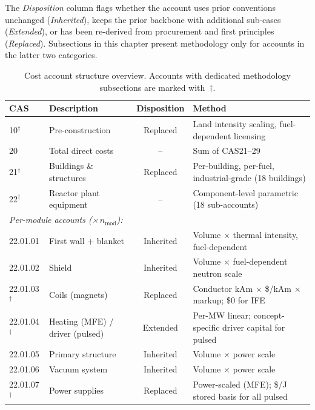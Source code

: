\documentclass{article}
\begin{document}
The \emph{Disposition} column flags whether the account uses prior
conventions unchanged (\emph{Inherited}), keeps the prior backbone
with additional sub-cases (\emph{Extended}), or has been re-derived
from procurement and first principles (\emph{Replaced}). Subsections
in this chapter present methodology only for accounts in the latter
two categories.

\begin{table}[htbp]
\caption{Cost account structure overview. Accounts with dedicated
methodology subsections are marked with~$\dagger$.}
\label{tab:cas-overview}
\centering
\begin{tabular}{llcp{6.0cm}}
\toprule
CAS & Description & Disposition & Method \\
\midrule
10$^\dagger$ & Pre-construction & Replaced & Land intensity scaling, fuel-dependent licensing \\
20 & Total direct costs & -- & Sum of CAS21--29 \\
21$^\dagger$ & Buildings \& structures & Replaced & Per-building, per-fuel, industrial-grade (18 buildings) \\
22$^\dagger$ & Reactor plant equipment & -- & Component-level parametric (18 sub-accounts) \\
\multicolumn{4}{l}{\textit{Per-module accounts (×\,$n_{\text{mod}}$):}} \\
\hspace{1em}22.01.01 & First wall + blanket & Inherited & Volume $\times$ thermal intensity, fuel-dependent \\
\hspace{1em}22.01.02 & Shield & Inherited & Volume $\times$ fuel-dependent neutron scale \\
\hspace{1em}22.01.03$^\dagger$ & Coils (magnets) & Replaced & Conductor kAm $\times$ \$/kAm $\times$ markup; \$0 for IFE \\
\hspace{1em}22.01.04$^\dagger$ & Heating (MFE) / driver (pulsed) & Extended & Per-MW linear; concept-specific driver capital for pulsed \\
\hspace{1em}22.01.05 & Primary structure & Inherited & Volume $\times$ power scale \\
\hspace{1em}22.01.06 & Vacuum system & Inherited & Volume $\times$ power scale \\
\hspace{1em}22.01.07$^\dagger$ & Power supplies & Replaced & Power-scaled (MFE); \$/J stored basis for all pulsed \\

\end{tabular}
\end{table}
\end{document}
